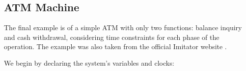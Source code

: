 \begin{table}[h!]
\centering
{}
\caption{Synthesis of properties and corresponding results.}
\label{tab:property_results}
\end{table}


\subsection{ATM Machine}

The final example is of a simple ATM with only two functions: balance inquiry and cash withdrawal, considering time constraints for each phase of the operation. The example was also taken from the official Imitator website \cite{IMITATOR}.



We begin by declaring the system's variables and clocks:

